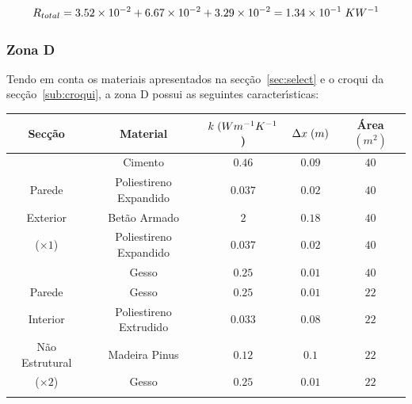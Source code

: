 \documentclass[12pt, a4paper]{article}
\begin{document}
\begin{equation}
	R_{total} =
			3.52 \times 10^{-2} + 6.67 \times 10^{-2} + 3.29 \times 10^{-2} = 1.34 \times 10^{-1} \hspace{1mm} KW^{-1}
	\label{eq:zona_c_total}
\end{equation}


\subsubsection{Zona D}\label{ssub:Zona D}

Tendo em conta os materiais apresentados na sec\c{c}\~ao~\ref{sec:select} e o croqui da
sec\c{c}\~ao~\ref{sub:croqui}, a zona D possui as seguintes caracter\'{\i}sticas:

\begin{table}[htpb]
    \begin{center}
        \begin{tabular}{c c c c c}
            \toprule{}
            Sec\c{c}\~ao & Material & $ k \hspace{1mm} (Wm^{-1}K^{-1}$) & $ \Delta x \hspace{1mm} (m)$ & \'Area $(m^2) $ \\
            \midrule{}

            \multirow{5}{*}{} & Cimento & $0.46$ & $0.09$ & $40$ \\
            \cline{2-5}
            Parede & Poliestireno Expandido & $0.037$ & $0.02$ & $40$ \\
            \cline{2-5}
            Exterior & Bet\~ao Armado & $2$ & $0.18$ & $40$ \\
            \cline{2-5}
            ($\times 1$) & Poliestireno Expandido & $0.037$ & $0.02$ & $40$ \\
            \cline{2-5}
                    & Gesso & $0.25$ & $0.01$ & $40$ \\
            \midrule{}

            Parede \multirow{4}{*}{} & Gesso & $0.25$ & $0.01$ & $22$ \\
            \cline{2-5}
            Interior & Poliestireno Extrudido & $0.033$ & $0.08$ & $22$ \\
            \cline{2-5}
            N\~ao Estrutural & Madeira Pinus & $0.12$ & $0.1$ & $22$ \\
            \cline{2-5}
            ($\times2$) & Gesso & $0.25$ & $0.01$ & $22$ \\
            \midrule{}


\end{tabular}
\end{center}
\end{table}
\end{document}
